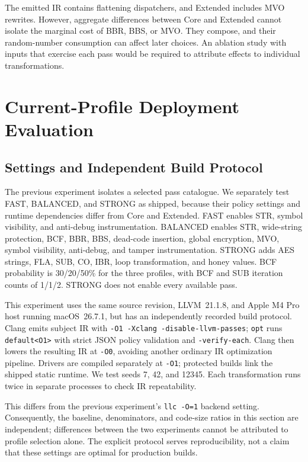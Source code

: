 \documentclass[conference]{IEEEtran}
\begin{document}
The emitted IR contains flattening dispatchers, and Extended includes
MVO rewrites. However, aggregate differences between Core and Extended
cannot isolate the marginal cost of BBR, BBS, or MVO. They compose,
and their random-number consumption can affect later choices.
An ablation study with inputs that exercise each pass would be required
to attribute effects to individual transformations.


\section{Current-Profile Deployment Evaluation}
\label{sec:profiles}

\subsection{Settings and Independent Build Protocol}

The previous experiment isolates a selected pass catalogue. We separately
test FAST, BALANCED, and STRONG as shipped, because their policy settings
and runtime dependencies differ from Core and Extended.
FAST enables STR, symbol visibility, and anti-debug instrumentation.
BALANCED enables STR, wide-string protection, BCF, BBR, BBS, dead-code
insertion, global encryption, MVO, symbol visibility, anti-debug, and tamper
instrumentation. STRONG adds AES strings, FLA, SUB, CO, IBR, loop
transformation, and honey values. BCF probability is 30/20/50\% for the
three profiles, with BCF and SUB iteration counts of 1/1/2.
STRONG does not enable every available pass.

This experiment uses the same source revision, LLVM~21.1.8, and Apple M4 Pro
host running macOS~26.7.1, but has an independently recorded build protocol.
Clang emits subject IR with \texttt{-O1 -Xclang -disable-llvm-passes};
\texttt{opt} runs \texttt{default<O1>} with strict JSON policy validation
and \texttt{-verify-each}. Clang then lowers the resulting IR at
\texttt{-O0}, avoiding another ordinary IR optimization pipeline.
Drivers are compiled separately at \texttt{-O1}; protected builds link the
shipped static runtime. We test seeds 7, 42, and 12345. Each transformation
runs twice in separate processes to check IR repeatability.

This differs from the previous experiment's \texttt{llc -O=1} backend
setting. Consequently, the baseline, denominators, and code-size ratios
in this section are independent; differences between the two experiments
cannot be attributed to profile selection alone. The explicit protocol
serves reproducibility, not a claim that these settings are optimal for
production builds.
\end{document}
